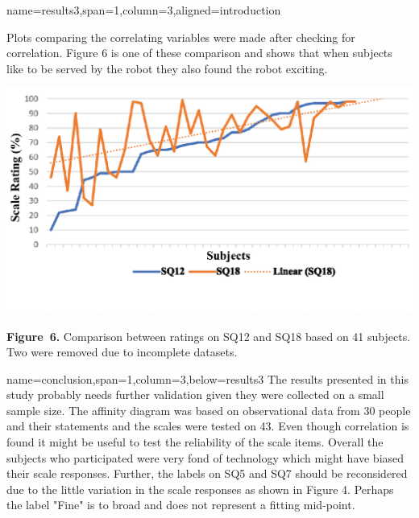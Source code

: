 \documentclass[paperwidth=118cm,paperheight=84cm,landscape,fontscale=0.2941]{baposter}
\begin{document}
\begin{poster}
{%


	


}


\headerbox{ }
{name=results3,span=1,column=3,aligned=introduction}
{\parskip 5pt
Plots comparing the correlating variables were made after checking for correlation. Figure 6 is one of these comparison and shows that when subjects like to be served by the robot they also found the robot exciting. 
\begin{center}
\includegraphics[width=0.9\linewidth]{SQ12_SQ18.eps}

\textbf{Figure~6. }\footnotesize{Comparison between ratings on SQ12 and SQ18 based on 41 subjects. Two were removed due to incomplete datasets.}
\end{center}
}

{name=conclusion,span=1,column=3,below=results3}
{\parskip 5pt
The results presented in this study probably needs further validation given they were collected on a small sample size. The affinity diagram was based on observational data from 30 people and their statements and the scales were tested on 43. Even though correlation is found it might be useful to test the reliability of the scale items. Overall the subjects who participated were very fond of technology which might have biased their scale responses. Further, the labels on SQ5 and SQ7 should be reconsidered due to the little variation in the scale responses as shown in Figure 4. Perhaps the label "Fine" is to broad and does not represent a fitting mid-point.
}



\end{poster}
\end{document}
